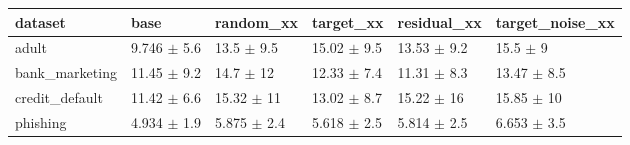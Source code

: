 \begin{tabular}{llllll}
\toprule
dataset & base & random\_xx & target\_xx & residual\_xx & target\_noise\_xx \\
\midrule
adult & 9.746 $\pm$ 5.6 & 13.5 $\pm$ 9.5 & 15.02 $\pm$ 9.5 & 13.53 $\pm$ 9.2 & 15.5 $\pm$ 9 \\
bank\_marketing & 11.45 $\pm$ 9.2 & 14.7 $\pm$ 12 & 12.33 $\pm$ 7.4 & 11.31 $\pm$ 8.3 & 13.47 $\pm$ 8.5 \\
credit\_default & 11.42 $\pm$ 6.6 & 15.32 $\pm$ 11 & 13.02 $\pm$ 8.7 & 15.22 $\pm$ 16 & 15.85 $\pm$ 10 \\
phishing & 4.934 $\pm$ 1.9 & 5.875 $\pm$ 2.4 & 5.618 $\pm$ 2.5 & 5.814 $\pm$ 2.5 & 6.653 $\pm$ 3.5 \\
\bottomrule
\end{tabular}
